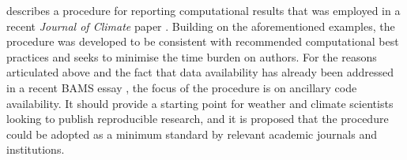  describes a procedure for reporting computational results that was employed in a recent \textit{Journal of Climate} paper \citep[][hereafter referred to as IS2015]{IrvingSimmonds2015}. Building on the aforementioned examples, the procedure was developed to be consistent with recommended computational best practices and seeks to minimise the time burden on authors. For the reasons articulated above and the fact that data availability has already been addressed in a recent BAMS essay \citep{Mayernik2015a}, the focus of the procedure is on ancillary code availability. It should provide a starting point for weather and climate scientists looking to publish reproducible research, and it is proposed that the procedure could be adopted as a minimum standard by relevant academic journals and institutions.
